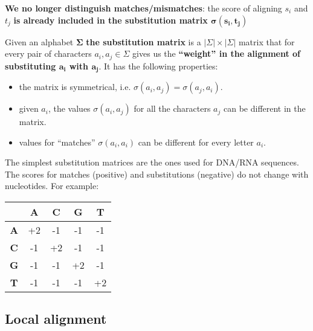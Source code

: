\documentclass[../main.tex]{subfiles}
\begin{document}
\textbf{We no longer distinguish matches/mismatches}: the score of aligning $s_i$ and $t_j$ \textbf{is already included in the substitution matrix $\bm{\sigma(s_i, t_j)}$}

Given an alphabet $\bm{\Sigma}$\textbf{ the substitution matrix} is a $|\Sigma|\times|\Sigma|$ matrix that for every pair of characters $a_i, a_j \in \Sigma$ gives us the \textbf{``weight'' in the alignment of substituting $\mathbf{a_i}$ with $\mathbf{a_j}$}. It has the following properties:
\begin{itemize}
\item the matrix is symmetrical, i.e. $\sigma(a_i, a_j) = \sigma(a_j, a_i)$.
\item given $a_i$, the values $\sigma(a_i, a_j)$ for all the characters $a_j$ can be different in the matrix.
\item values for ``matches'' $\sigma(a_i, a_i)$ can be different for every letter $a_i$.
\end{itemize}

The simplest substitution matrices are the ones used for DNA/RNA sequences. The scores for matches (positive) and substitutions (negative) do not change with nucleotides. For example:

\begin{center}
\begin{tabular}{|c|c|c|c|c|}
\hline
& \textbf{A} & \textbf{C} & \textbf{G} & \textbf{T} \\
\hline
\textbf{A} & +2 & -1 & -1 & -1 \\
\hline
\textbf{C} & -1 & +2 & -1 & -1 \\
\hline
\textbf{G} & -1 & -1 & +2 & -1 \\
\hline
\textbf{T} & -1 & -1 & -1 & +2 \\
\hline
\end{tabular}
\end{center}

\subsection{Local alignment}
\end{document}
